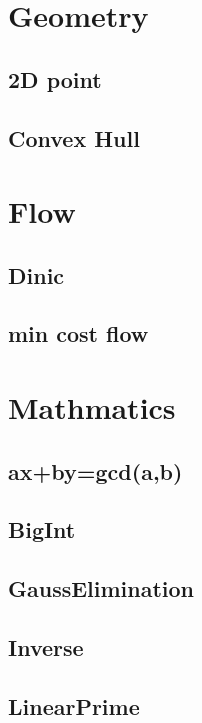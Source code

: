 \section{Geometry}

\subsection{2D point}

\subsection{Convex Hull}


\section{Flow}

\subsection{Dinic}

\subsection{min cost flow}


\section{Mathmatics}

\subsection{ax+by=gcd(a,b)}

\subsection{BigInt}

\subsection{GaussElimination}

\subsection{Inverse}

\subsection{LinearPrime}

